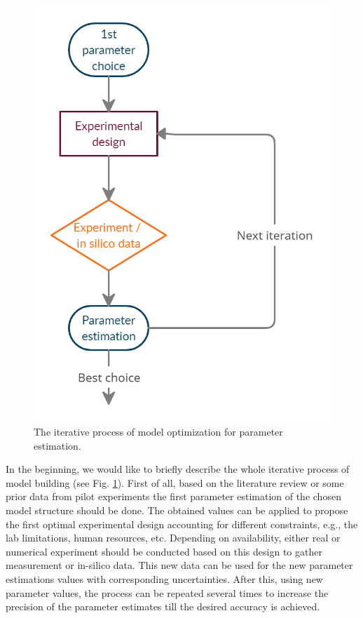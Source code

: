 \documentclass[10pt,A4paper]{article}
\begin{document}
\begin{figure}[H]
    \centering
    \includegraphics[scale=0.3]{Figures/scheme.png}
    \caption{The iterative process of model optimization for parameter estimation.}
    \label{fig:expdesign_scheme}
\end{figure}
In the beginning, we would like to briefly describe the whole iterative process of model building (see Fig. \ref{fig:expdesign_scheme}).
First of all, based on the literature review or some prior data from pilot experiments the first parameter estimation of the chosen model structure should be done.
The obtained values can be applied to propose the first optimal experimental design accounting for different constraints, e.g., the lab limitations, human resources, etc. 
Depending on availability, either real or numerical experiment should be conducted based on this design to gather measurement or in-silico data. 
This new data can be used for the new parameter estimations values with corresponding uncertainties.
After this, using new parameter values, the process can be repeated several times to increase the precision of the parameter estimates till the desired accuracy is achieved.
\end{document}
